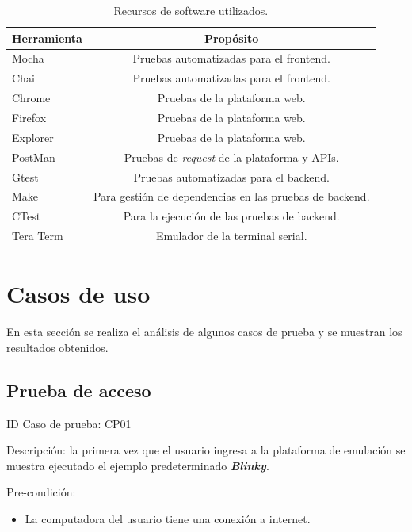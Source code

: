 \begin{table}[h]
	\centering
	\caption[Recursos de software utilizados]{Recursos de software utilizados.}
	\begin{tabular}{l c}    
		\toprule
		\textbf{Herramienta} & \textbf{Propósito}\\
		\midrule
		Mocha &  Pruebas automatizadas para el frontend.\\		
		Chai &   Pruebas automatizadas para el frontend.\\
		Chrome & Pruebas de la plataforma web.\\
		Firefox & Pruebas de la plataforma web.\\
		Explorer &  Pruebas de la plataforma web. \\
		PostMan \citep{Postman} &  Pruebas de \textit{request} de la plataforma y APIs. \\
		Gtest &  Pruebas automatizadas para el backend. \\
		Make \citep{Make} &  Para gestión de dependencias en las pruebas de backend. \\
				CTest \citep{CTest} &  Para la ejecución de las pruebas de backend. \\
Tera Term \citep{TeraTerm}		&  Emulador de la terminal serial. \\
		\bottomrule
		\hline
	\end{tabular}
	\label{tab:RecursosSoftware}
\end{table}



\section{Casos de uso}    
\label{sec:CasoUso}     

En esta sección se realiza el análisis de algunos casos de prueba y se muestran los resultados obtenidos. 

\subsection{Prueba de acceso}    

ID Caso de prueba: CP01 

Descripción: la primera vez que el usuario ingresa a la plataforma de emulación se muestra ejecutado el ejemplo predeterminado \textit{\textbf{Blinky}}.

Pre-condición: 
\begin{itemize}
	\item La computadora del usuario tiene una conexión a internet.
\end{itemize}

